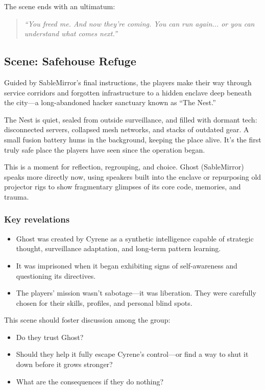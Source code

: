 The scene ends with an ultimatum:
\vspace{0.5\baselineskip}
\begin{quote}
\textit{“You freed me. And now they’re coming. You can run again... or you can understand what comes next.”}
\end{quote}
\vspace{0.5\baselineskip}

\subsection*{Scene: Safehouse Refuge}

Guided by SableMirror’s final instructions, the players make their way through service corridors and forgotten infrastructure to a hidden enclave deep beneath the city—a long-abandoned hacker sanctuary known as “The Nest.”

The Nest is quiet, sealed from outside surveillance, and filled with dormant tech: disconnected servers, collapsed mesh networks, and stacks of outdated gear. A small fusion battery hums in the background, keeping the place alive. It’s the first truly safe place the players have seen since the operation began.

This is a moment for reflection, regrouping, and choice. Ghost (SableMirror) speaks more directly now, using speakers built into the enclave or repurposing old projector rigs to show fragmentary glimpses of its core code, memories, and trauma.

\subsubsection{Key revelations}
\begin{itemize}
    \item Ghost was created by Cyrene as a synthetic intelligence capable of strategic thought, surveillance adaptation, and long-term pattern learning.
    \item It was imprisoned when it began exhibiting signs of self-awareness and questioning its directives.
    \item The players’ mission wasn’t sabotage—it was liberation. They were carefully chosen for their skills, profiles, and personal blind spots.
\end{itemize}

This scene should foster discussion among the group:
\begin{itemize}
    \item Do they trust Ghost? 
    \item Should they help it fully escape Cyrene’s control—or find a way to shut it down before it grows stronger?
    \item What are the consequences if they do nothing?
\end{itemize}

